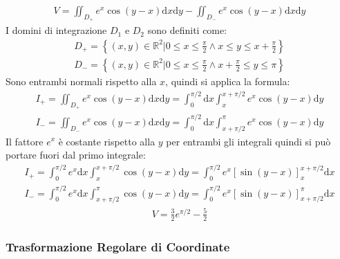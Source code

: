\documentclass{article}
\newcommand{\df}{\mathrm{d}}
\numberwithin{equation}{subsection}
\begin{document}
\begin{gather*}
    V=\iint_{D_+}e^x\cos(y-x)\df x\df y-\iint_{D_-}e^x\cos(y-x)\df x\df y
\end{gather*}
I domini di integrazione $D_1$ e $D_2$ sono definiti come:
\begin{gather*}
    D_+=\left\{(x,y)\in\mathbb{R}^2\big|0\leq x\leq\frac{\pi}{2}\land x\leq y\leq x+\frac{\pi}{2}\right\}\\
    D_-=\left\{(x,y)\in\mathbb{R}^2\big|0\leq x\leq\frac{\pi}{2}\land x+\frac{\pi}{2}\leq y\leq {\pi}\right\}
\end{gather*}
Sono entrambi normali rispetto alla $x$, quindi si applica la formula:
\begin{gather*}
    I_+=\iint_{D_+}e^x\cos(y-x)\df x\df y=\int_0^{\pi/2}\df x\int_x^{x+\pi/2}e^x\cos(y-x)\df y\\
    I_-=\iint_{D_-}e^x\cos(y-x)\df x\df y=\int_0^{\pi/2}\df x\int_{x+\pi/2}^\pi e^x\cos(y-x)\df y
\end{gather*}
Il fattore $e^x$ è costante rispetto alla $y$ per entrambi gli integrali quindi si può portare fuori dal primo integrale:
\begin{gather*}
    I_+=\int_0^{\pi/2}e^x\df x\int_x^{x+\pi/2}\cos(y-x)\df y=
    \int_0^{\pi/2}e^x\left[\sin(y-x)\right]_x^{x+\pi/2}\df x\\
    I_-=\int_0^{\pi/2}e^x\df x\int_{x+\pi/2}^\pi\cos(y-x)\df y=
    \int_0^{\pi/2}e^x\left[\sin(y-x)\right]_{x+\pi/2}^\pi\df x
\end{gather*}
\begin{gather*}
    V=\frac{3}{2}e^{\pi/2}-\frac{5}{2}
\end{gather*}


\subsubsection{Trasformazione Regolare di Coordinate}
\end{document}
